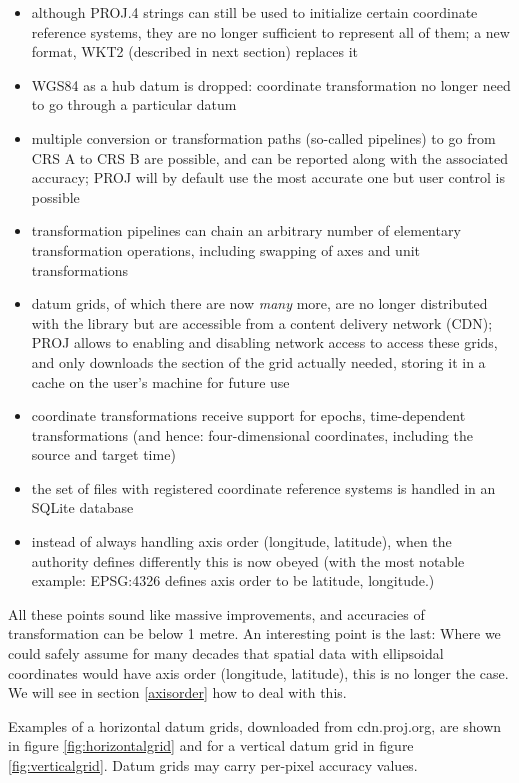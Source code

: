 \documentclass[]{book}
\providecommand{\tightlist}{%
  \setlength{\itemsep}{0pt}\setlength{\parskip}{0pt}}
\begin{document}
\begin{itemize}
\tightlist
\item
  although PROJ.4 strings can still be used to initialize certain
  coordinate reference systems, they are no longer sufficient to
  represent all of them; a new format, WKT2 (described in next section)
  replaces it
\item
  WGS84 as a hub datum is dropped: coordinate transformation no longer
  need to go through a particular datum
\item
  multiple conversion or transformation paths (so-called pipelines)
  to go from CRS A to CRS B are possible, and can be reported along
  with the associated accuracy; PROJ will by default use the most accurate
  one but user control is possible
\item
  transformation pipelines can chain an arbitrary number of
  elementary transformation operations, including swapping of axes
  and unit transformations
\item
  datum grids, of which there are now \emph{many} more, are no longer distributed
  with the library but are accessible from a content delivery network (CDN); PROJ allows to enabling and
  disabling network access to access these grids, and only downloads the section
  of the grid actually needed, storing it in a cache on the user's machine for
  future use
\item
  coordinate transformations receive support for epochs, time-dependent
  transformations (and hence: four-dimensional coordinates, including the
  source and target time)
\item
  the set of files with registered coordinate reference systems is handled
  in an SQLite database
\item
  instead of always handling axis order (longitude, latitude),
  when the authority defines differently this is now obeyed (with the
  most notable example: EPSG:4326 defines axis order to be latitude,
  longitude.)
\end{itemize}

All these points sound like massive improvements, and accuracies
of transformation can be below 1 metre. An interesting point
is the last: Where we could safely assume for many decades that
spatial data with ellipsoidal coordinates would have axis order
(longitude, latitude), this is no longer the case. We will see in
section \ref{axisorder} how to deal with this.

Examples of a horizontal datum grids, downloaded from cdn.proj.org,
are shown in figure \ref{fig:horizontalgrid} and for a vertical
datum grid in figure \ref{fig:verticalgrid}. Datum grids may carry
per-pixel accuracy values.
\end{document}
